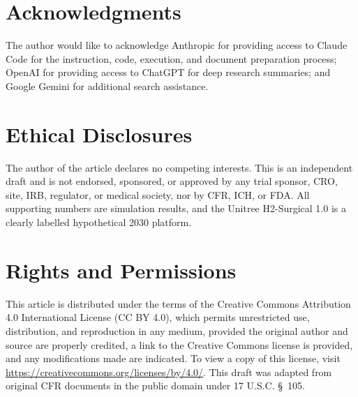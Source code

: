 
{}
\section*{Acknowledgments}
\label{sec:acknowledgments}

The author would like to acknowledge Anthropic for providing access to Claude
Code for the instruction, code, execution, and document preparation process;
OpenAI for providing access to ChatGPT for deep research summaries; and Google
Gemini for additional search assistance.

{}
\section*{Ethical Disclosures}
\label{sec:ethics}

The author of the article declares no competing interests. This is an independent
draft and is not endorsed, sponsored, or approved by any trial sponsor, CRO, site,
IRB, regulator, or medical society, nor by CFR, ICH, or FDA. All supporting
numbers are simulation results, and the Unitree H2-Surgical 1.0 is a clearly
labelled hypothetical 2030 platform.

{}
\section*{Rights and Permissions}
\label{sec:rights}

This article is distributed under the terms of the Creative Commons Attribution
4.0 International License (CC BY 4.0), which permits unrestricted use,
distribution, and reproduction in any medium, provided the original author and
source are properly credited, a link to the Creative Commons license is provided,
and any modifications made are indicated. To view a copy of this license, visit
\url{https://creativecommons.org/licenses/by/4.0/}. This draft was adapted from
original CFR documents in the public domain under 17 U.S.C. \S~105.

{}
